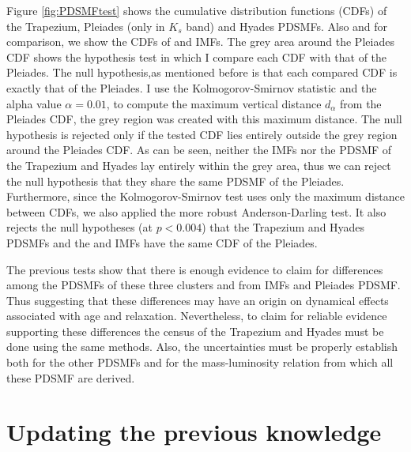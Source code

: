 Figure \ref{fig:PDSMFtest} shows the cumulative distribution functions (CDFs) of the Trapezium, Pleiades (only in $K_s$ band) and Hyades PDSMFs. Also and for comparison, we show the CDFs of \citet{Chabrier2005} and \citet{Thies2007} IMFs. The grey area around the Pleiades CDF shows the hypothesis test in which I compare each CDF with that of the Pleiades. The null hypothesis,as mentioned before is that each compared CDF is exactly that of the Pleiades. I use the Kolmogorov-Smirnov statistic and the alpha value $\alpha = 0.01$, to compute the maximum vertical distance $d_{\alpha}$ from the Pleiades CDF, the grey region was created with this maximum distance. The null hypothesis is rejected only if the tested CDF lies entirely outside the grey region around the Pleiades CDF. As can be seen, neither the IMFs nor the PDSMF of the Trapezium and Hyades lay entirely within the grey area, thus we can reject the null hypothesis that they share the same PDSMF of the Pleiades. Furthermore, since the Kolmogorov-Smirnov test uses only the maximum distance between CDFs, we also applied the more robust Anderson-Darling test. It also rejects the null hypotheses (at $p < 0.004$) that the Trapezium and Hyades PDSMFs and the \citet{Chabrier2005} and \citet{Thies2007} IMFs have the same CDF of the Pleiades. 

The previous tests show that there is enough evidence to claim for differences among the PDSMFs of these three clusters and from IMFs and Pleiades PDSMF. Thus suggesting that these differences may have an origin on dynamical effects associated with age and relaxation. Nevertheless, to claim for reliable evidence supporting these differences the census of the Trapezium and Hyades must be done using the same methods. Also, the uncertainties must be properly establish both for the other PDSMFs and for the mass-luminosity relation from which all these PDSMF are derived. 

\section{Updating the previous knowledge}
